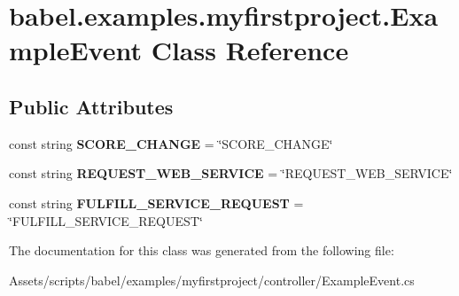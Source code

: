 \hypertarget{classbabel_1_1examples_1_1myfirstproject_1_1_example_event}{\section{babel.\-examples.\-myfirstproject.\-Example\-Event Class Reference}
\label{classbabel_1_1examples_1_1myfirstproject_1_1_example_event}
}
\subsection*{Public Attributes}
\begin{DoxyCompactItemize}
\item 
\hypertarget{classbabel_1_1examples_1_1myfirstproject_1_1_example_event_ad5bf8322d269fc0168f52496e80a1a89}{const string {\bfseries S\-C\-O\-R\-E\-\_\-\-C\-H\-A\-N\-G\-E} = \char`\"{}S\-C\-O\-R\-E\-\_\-\-C\-H\-A\-N\-G\-E\char`\"{}}\label{classbabel_1_1examples_1_1myfirstproject_1_1_example_event_ad5bf8322d269fc0168f52496e80a1a89}

\item 
\hypertarget{classbabel_1_1examples_1_1myfirstproject_1_1_example_event_a70604f982d2837e2e9d6c35c96dd84f7}{const string {\bfseries R\-E\-Q\-U\-E\-S\-T\-\_\-\-W\-E\-B\-\_\-\-S\-E\-R\-V\-I\-C\-E} = \char`\"{}R\-E\-Q\-U\-E\-S\-T\-\_\-\-W\-E\-B\-\_\-\-S\-E\-R\-V\-I\-C\-E\char`\"{}}\label{classbabel_1_1examples_1_1myfirstproject_1_1_example_event_a70604f982d2837e2e9d6c35c96dd84f7}

\item 
\hypertarget{classbabel_1_1examples_1_1myfirstproject_1_1_example_event_a3e53b572ae9bff2eae085ba6a6190b29}{const string {\bfseries F\-U\-L\-F\-I\-L\-L\-\_\-\-S\-E\-R\-V\-I\-C\-E\-\_\-\-R\-E\-Q\-U\-E\-S\-T} = \char`\"{}F\-U\-L\-F\-I\-L\-L\-\_\-\-S\-E\-R\-V\-I\-C\-E\-\_\-\-R\-E\-Q\-U\-E\-S\-T\char`\"{}}\label{classbabel_1_1examples_1_1myfirstproject_1_1_example_event_a3e53b572ae9bff2eae085ba6a6190b29}

\end{DoxyCompactItemize}


The documentation for this class was generated from the following file\-:\begin{DoxyCompactItemize}
\item 
Assets/scripts/babel/examples/myfirstproject/controller/Example\-Event.\-cs\end{DoxyCompactItemize}
